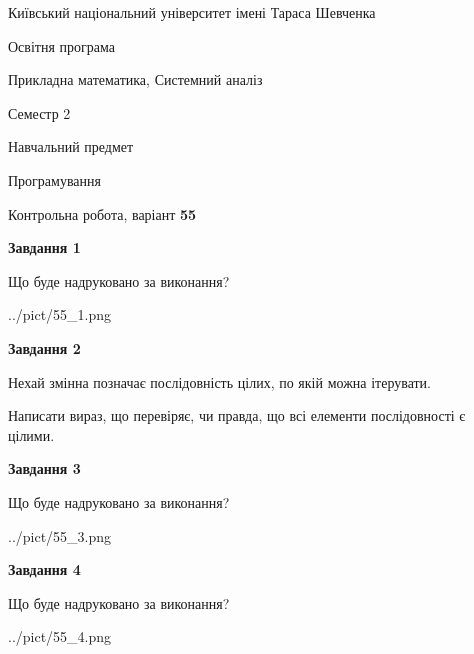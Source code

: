 \documentclass[12pt, ukrainian]{article}
\begin{document}
{{\begin {small}\par
{ \center  Київський національний університет імені Тараса Шевченка \par}
{\parbox {5 cm}{Освітня програма \hfill}{\parbox {8 cm}{Прикладна математика, Системний аналіз \hfill}}\parbox {5 cm}{\hfill Семестр 2}}\par
{\parbox {5 cm} {Навчальний предмет \hfill}\parbox {7 cm}{Програмування \hfill}\parbox {6cm}{\hfill}\par}\vspace{-7pt} \end{small}}{\center Контрольна робота, варіант  \No \textbf
{ 55 }\par}}
{
\begin {large}
{\begin {center}\textbf{Завдання 1}\end {center}}\par
Що буде надруковано за виконання?\par\par
\begin{center}
	{../pict/55_1.png}
\end{center}
\newpage

{\begin {center}\textbf{Завдання 2}\end {center}}\par
Нехай змінна  позначає послідовність цілих, по якій можна ітерувати.

Написати вираз, що перевіряє, чи правда, що всі елементи послідовності є цілими.\par
\newpage

{\begin {center}\textbf{Завдання 3}\end {center}}\par
Що буде надруковано за виконання?\par
\begin{center}
	{../pict/55_3.png}
\end{center}
\newpage

{\begin {center}\textbf{Завдання 4}\end {center}}\par
Що буде надруковано за виконання?\par
\begin{center}
	{../pict/55_4.png}
\end{center}
\newpage


\end{large}}
\end{document}
